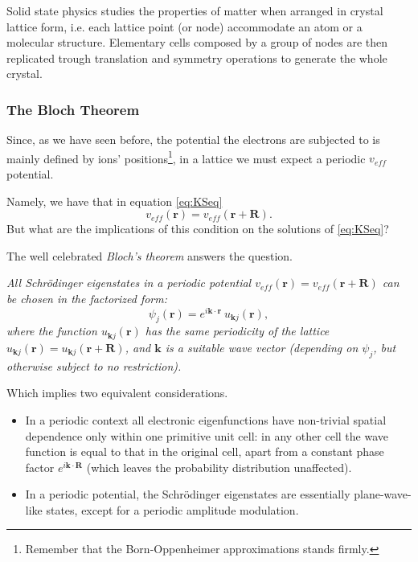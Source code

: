 \documentclass[a4paper,12pt]{article}
\newcommand\mf[1]{\mathbf{#1}}
\newcommand\erre{\mathbf{r}}
\begin{document}
Solid state physics studies the properties of matter when arranged in crystal lattice form, i.e. each lattice point (or node) accommodate an atom or a molecular structure. 
Elementary cells composed by a group of nodes are then replicated trough translation and symmetry operations to generate the whole crystal.
\subsubsection{The Bloch Theorem}
Since, as we have seen before, the potential the electrons are subjected to is mainly defined by ions' positions\footnote{Remember that the Born-Oppenheimer approximations stands firmly.}, in a lattice we must expect a periodic $v_{eff}$ potential.

Namely, we have that in equation \eqref{eq:KSeq} 
\begin{equation}
	v_{eff}(\erre) = 	v_{eff}(\erre + \mf{R}).
\end{equation}
But what are the implications of this condition on the solutions of \eqref{eq:KSeq}?

The well celebrated \textit{Bloch's theorem} \cite[p.136]{Manini} answers the question.

\begin{center}
\begin{framed}

\textit{All Schr\"odinger eigenstates in a periodic potential $v_{eff}(\erre) = 	v_{eff}(\erre + \mf{R})$ can be chosen in the factorized form:}
\begin{equation}\label{eq:Bloch}
		\psi_{j}(\erre) = e^{i \mf{k} \cdot \erre } ~ u_{\mf{k}j}(\erre), 
\end{equation}
\textit{where the function $u_{\mf{k}j}(\erre)$ has the same periodicity of the lattice $u_{\mf{k}j}(\erre) = u_{\mf{k}j}(\erre + \mf{R}) $, and $\mf{k}$ is a suitable wave vector (depending on $\psi_j$, but otherwise subject to no restriction).}
\end{framed}
\end{center}

Which implies two equivalent considerations.
\begin{itemize}
	\item In a periodic context all electronic eigenfunctions have non-trivial spatial  dependence only within one primitive unit cell: in any other cell the wave function is equal to that in the original cell, apart from a constant phase factor $e^{i \mf{k} \cdot \mf{R}}$ (which leaves the probability distribution unaffected).
	\item In a periodic potential, the Schr\"odinger eigenstates are essentially plane-wave-like states, except for a periodic amplitude modulation.
\end{itemize}
\end{document}
